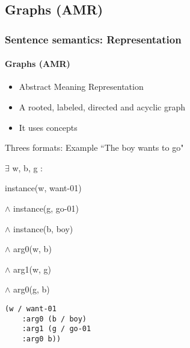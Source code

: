 \documentclass[xcolor=table]{beamer}
\begin{document}
\subsection{Graphs (AMR)}

\begin{frame}[fragile]
	\frametitle{Sentence semantics: Representation}
	\framesubtitle{Graphs (AMR)}
	
	\begin{itemize}
		\item Abstract Meaning Representation \cite{2013-banarescu-al}
		\item A rooted, labeled, directed and acyclic graph
		\item It uses  concepts
	\end{itemize}

	\begin{exampleblock}{Threes formats: Example ``The boy wants to go"}
		\begin{minipage}{.3\textwidth}
			
			\footnotesize
			$ \exists $ w, b, g : 
			
			instance(w, want-01) 
			
			$ \wedge $ instance(g, go-01) 
			
			$ \wedge $ instance(b, boy) 
			
			$ \wedge $ arg0(w, b) 
			
			$ \wedge $ arg1(w, g) 
			
			$ \wedge $ arg0(g, b)
		\end{minipage}
		\begin{minipage}{.35\textwidth}
			
			\begin{verbatim}
(w / want-01
    :arg0 (b / boy)
    :arg1 (g / go-01
    :arg0 b))
			\end{verbatim}
			
		\end{minipage}
		\begin{minipage}{.3\textwidth}
			
		\end{minipage}
	\end{exampleblock}
	
\end{frame}
\end{document}
